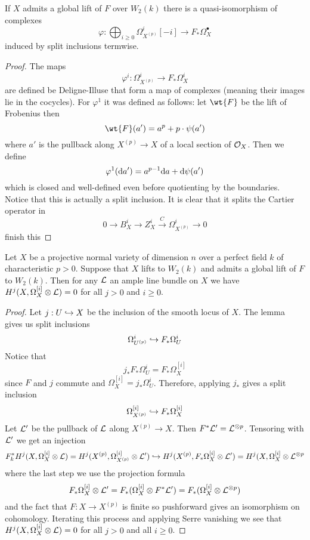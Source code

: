 \documentclass[12pt]{article}
\begin{document}
\begin{lemma}
If $X$ admits a global lift of $F$ over $W_2(k)$ there is a quasi-isomorphism of complexes
\[ \varphi : \bigoplus_{i \ge 0} \Omega_{X^{(p)}}^i[-i] \to F_* \Omega^\bullet_X \]
induced by split inclusions termwise.
\end{lemma}

\begin{proof}
The maps 
\[ \varphi^i : \Omega^i_{X^{(p)}} \to F_* \Omega^i_X \]
are defined be Deligne-Illuse that form a map of complexes (meaning their images lie in the cocycles). For $\varphi^1$ it was defined as follows: let $\wt{F}$ be the lift of Frobenius then
\[ \wt{F}(a') = a^p + p \cdot \psi(a') \]
where $a'$ is the pullback along $X^{(p)} \to X$ of a local section of $\mathcal{O}_{X}$. Then we define
\[ \varphi^1(\mathrm{d}{a'}) = a^{p-1} \mathrm{d}{a} + \mathrm{d}{\psi(a')} \]
which is closed and well-defined even before quotienting by the boundaries. Notice that this is actually a split inclusion. It is clear that it splits the Cartier operator in
\[ 0 \to B_X^i \to Z_X^i \xrightarrow{C} \Omega_{X^{(p)}}^i \to 0 \]
{\color{red} finish this}
\end{proof}

\begin{prop}
Let $X$ be a projective normal variety of  dimension $n$ over a perfect field $k$ of characteristic $p > 0$. Suppose that $X$ lifts to $W_2(k)$ and admits a global lift of $F$ to $W_2(k)$. Then for any $\mathcal{L}$ an ample line bundle on $X$ we have $H^j(X, \Omega_X^{[i]} \otimes \mathcal{L}) = 0$ for all $j > 0$ and $i \ge 0$.
\end{prop}

\begin{proof}
Let $j : U \hookrightarrow X$ be the inclusion of the smooth locus of $X$.
The lemma gives us split inclusions
\[ \Omega^i_{U^{(p)}} \hookrightarrow F_* \Omega_U^i \]
Notice that
\[ j_* F_* \Omega_U^i = F_* \Omega_X^{[i]} \]
since $F$ and $j$ commute and $\Omega_X^{[i]} = j_* \Omega_U^i$. Therefore, applying $j_*$ gives a split inclusion
\[ \Omega^{[i]}_{X^{(p)}} \hookrightarrow F_* \Omega_X^{[i]} \]
Let $\mathcal{L}'$ be the pullback of $\mathcal{L}$ along $X^{(p)} \to X$. Then $F^* \mathcal{L}' = \mathcal{L}^{\otimes p}$. Tensoring with $\mathcal{L}'$ we get an injection
\[ F_k^* H^j(X, \Omega_X^{[i]} \otimes \mathcal{L}) = H^j(X^{(p)}, \Omega_{X^{(p)}}^{[i]} \otimes \mathcal{L}') \hookrightarrow H^j(X^{(p)}, F_* \Omega_X^{[i]} \otimes \mathcal{L}') = H^j(X, \Omega_X^{[i]} \otimes \mathcal{L}^{\otimes p} \]
where the last step we use the projection formula
\[ F_* \Omega_X^{[i]} \otimes \mathcal{L}' = F_* (\Omega_X^{[i]} \otimes F^* \mathcal{L}') = F_* (\Omega_X^{[i]} \otimes \mathcal{L}^{\otimes p}) \]
and the fact that $F : X \to X^{(p)}$ is finite so pushforward gives an isomorphism on cohomology. Iterating this process and applying Serre vanishing we see that $H^j(X, \Omega_X^{[i]} \otimes \mathcal{L}) = 0$ for all $j > 0$ and all $i \ge 0$.
\end{proof}
\end{document}
